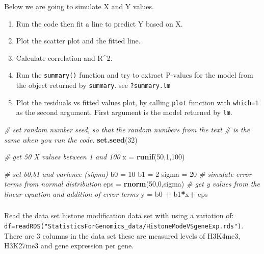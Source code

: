 \documentclass[12pt,]{krantz}
\newenvironment{Shaded}{\begin{snugshade}}{\end{snugshade}}
\newcommand{\CommentTok}[1]{\textcolor[rgb]{0.56,0.35,0.01}{\textit{#1}}}
\newcommand{\DecValTok}[1]{\textcolor[rgb]{0.00,0.00,0.81}{#1}}
\newcommand{\KeywordTok}[1]{\textcolor[rgb]{0.13,0.29,0.53}{\textbf{#1}}}
\newcommand{\NormalTok}[1]{#1}
\newcommand{\OperatorTok}[1]{\textcolor[rgb]{0.81,0.36,0.00}{\textbf{#1}}}
\newcommand{\StringTok}[1]{\textcolor[rgb]{0.31,0.60,0.02}{#1}}
\providecommand{\tightlist}{%
  \setlength{\itemsep}{0pt}\setlength{\parskip}{0pt}}
\begin{document}
Below we are going to simulate X and Y values.

\begin{enumerate}
\def\labelenumi{\arabic{enumi}.}
\tightlist
\item
  Run the code then fit a line to predict Y based on X.
\item
  Plot the scatter plot and the fitted line.
\item
  Calculate correlation and R\^{}2.
\item
  Run the \texttt{summary()} function and
  try to extract P-values for the model from the object
  returned by \texttt{summary}. see \texttt{?summary.lm}
\item
  Plot the residuals vs fitted values plot, by calling \texttt{plot}
  function with \texttt{which=1} as the second argument. First argument
  is the model returned by \texttt{lm}.
\end{enumerate}

\begin{Shaded}
\begin{Highlighting}[]
\CommentTok{# set random number seed, so that the random numbers from the text}
\CommentTok{# is the same when you run the code.}
\KeywordTok{set.seed}\NormalTok{(}\DecValTok{32}\NormalTok{)}

\CommentTok{# get 50 X values between 1 and 100}
\NormalTok{x =}\StringTok{ }\KeywordTok{runif}\NormalTok{(}\DecValTok{50}\NormalTok{,}\DecValTok{1}\NormalTok{,}\DecValTok{100}\NormalTok{)}

\CommentTok{# set b0,b1 and varience (sigma)}
\NormalTok{b0 =}\StringTok{ }\DecValTok{10}
\NormalTok{b1 =}\StringTok{ }\DecValTok{2}
\NormalTok{sigma =}\StringTok{ }\DecValTok{20}
\CommentTok{# simulate error terms from normal distribution}
\NormalTok{eps =}\StringTok{ }\KeywordTok{rnorm}\NormalTok{(}\DecValTok{50}\NormalTok{,}\DecValTok{0}\NormalTok{,sigma)}
\CommentTok{# get y values from the linear equation and addition of error terms}
\NormalTok{y =}\StringTok{ }\NormalTok{b0 }\OperatorTok{+}\StringTok{ }\NormalTok{b1}\OperatorTok{*}\NormalTok{x}\OperatorTok{+}\StringTok{ }\NormalTok{eps}
\end{Highlighting}
\end{Shaded}

\hypertarget{section-8}{%
\subsubsection{}\label{section-8}}

Read the data set histone modification data set with using a variation of:
\texttt{df=readRDS("StatisticsForGenomics\_data/HistoneModeVSgeneExp.rds")}. There
are 3 columns in the data set these are measured levels of H3K4me3,
H3K27me3 and gene expression per gene.
\end{document}
